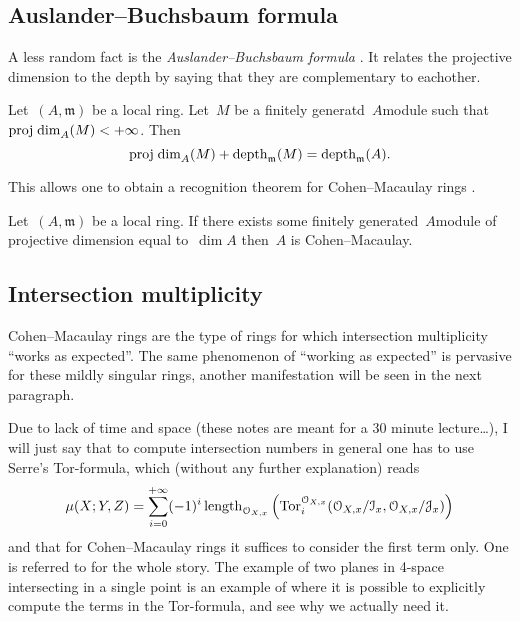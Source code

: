 \documentclass[10pt,a4paper]{article}
\begin{document}
\subsection{Auslander--Buchsbaum formula}
\label{subsection:auslander-buchsbaum}
A less random fact is the \emph{Auslander--Buchsbaum formula} \cite[theorem 19.9]{eisenbud-commutative-algebra}. It relates the projective dimension to the depth by saying that they are complementary to eachother.
\begin{theorem}
  Let~$(A,\mathfrak{m})$ be a local ring. Let~$M$ be a finitely generatd~$A$\dash module such that~$\operatorname{proj\;dim}_A(M)<+\infty$. Then
  \begin{equation}
    \operatorname{proj\;dim}_A(M)+\operatorname{depth}_{\mathfrak{m}}(M)=\operatorname{depth}_{\mathfrak{m}}(A).
  \end{equation}
\end{theorem}
This allows one to obtain a recognition theorem for Cohen--Macaulay rings \cite[corollary 19.10]{eisenbud-commutative-algebra}.
\begin{corollary}
  Let~$(A,\mathfrak{m})$ be a local ring. If there exists some finitely generated~$A$\dash module of projective dimension equal to~$\dim A$ then~$A$ is Cohen--Macaulay.
\end{corollary}

\subsection{Intersection multiplicity}
\label{subsection:intersection-multiplicity}
Cohen--Macaulay rings are the type of rings for which intersection multiplicity ``works as expected''. The same phenomenon of ``working as expected'' is pervasive for these mildly singular rings, another manifestation will be seen in the next paragraph.

Due to lack of time and space (these notes are meant for a 30 minute lecture\ldots), I will just say that to compute intersection numbers in general one has to use Serre's Tor-formula, which (without any further explanation) reads
\begin{equation}
  \mu(X;Y,Z)=\sum_{i=0}^{+\infty}(-1)^i\operatorname{length}_{\mathcal{O}_{X,x}}\left( \operatorname{Tor}_i^{\mathcal{O}_{X,x}}(\mathcal{O}_{X,x}/\mathcal{I}_x,\mathcal{O}_{X,x}/\mathcal{J}_x) \right)
\end{equation}
and that for Cohen--Macaulay rings it suffices to consider the first term only. One is referred to \cite{serre-algebre-locale} for the whole story. The example of two planes in 4-space intersecting in a single point is an example of where it is possible to explicitly compute the terms in the Tor-formula, and see why we actually need it.
\end{document}
